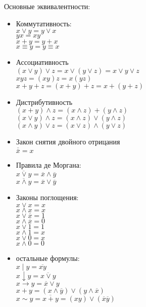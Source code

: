 Основные эквивалентности: 
\begin{itemize}
    \item Коммутативность: \\
            $x \vee y = y \vee x$ \\
            $yx = xy$ \\
            $x + y = y + x$ \\
            $x \equiv y = y \equiv x$
    \item Ассоциативность \\
            $(x \vee y) \vee z = x \vee (y \vee z) = x \vee y \vee z$ \\
            $xyz = (xy)z = x(yz)$ \\
            $x + y + z = (x + y) + z = x + (y + z)$
    \item Дистрибутивность \\
            $(x + y)\wedge z = (x\wedge z) + (y\wedge z)$ \\
            $(x \vee y)\wedge z = (x \wedge z)  \vee (y\wedge z)$ \\
            $(x\wedge y) \vee z = (x\vee z)\wedge(y \vee z)$
    \item Закон снятия двойного отрицания \\
            $\overline{\overline{x}} = x$
    \item Правила де Моргана: \\
            $\overline{x \vee y} = \overline{x}\wedge\overline{y}$ \\
            $\overline{x \wedge y} = \overline{x}\vee\overline{y}$
    \item Законы поглощения: \\
            $x \vee x = x$ \\
            $x \wedge x = x$ \\
            $x \vee \overline{x} = 1$ \\
            $x \wedge \overline{x} = 0$ \\
            $x \vee 1 = 1$ \\
            $x \wedge 1 = x$ \\
            $x \vee 0 = x$ \\
            $x \wedge 0 = 0$
    \item остальные формулы: \\
            $x\mid y = \overline{xy}$ \\
            $x \downarrow y = \overline{x \vee y}$ \\
            $x \rightarrow y = \overline{x} \vee y$ \\
            $x + y = (x \wedge \overline{y}) \vee (y \wedge \overline{x})$ \\
            $x \sim y = \overline{x + y} = (xy) \vee (\overline{x} \overline{y})$
\end{itemize}

